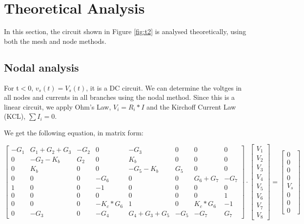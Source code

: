 \section{Theoretical Analysis}
\label{sec:analysis}

In this section, the circuit shown in Figure \ref{fig:t2} is analysed
theoretically,  using both the mesh and node methods.

\subsection{Nodal analysis}
For t$<$0,  $v_s(t)= V_s(t)$,  it is a DC circuit. We can determine the voltges in all nodes and currents in all branches using the nodal method.
Since this is a linear circuit,  we apply Ohm's Law,  $V_i= R_i * I$ and the Kirchoff Current Law (KCL),  $\sum I_i = 0$.

We get the following equation,  in matrix form:

\begin{equation}
\label{eq:matrixeq1}
\begin{bmatrix}
    -G_1 & G_1+G_2+G_3 & -G_2 & 0 & -G_3 & 0 & 0 & 0\\
    0 & -G_2-K_b & G_2 & 0 & K_b & 0 & 0 & 0\\
    0 & K_b & 0 & 0 & -G_5-K_b & G_5 & 0 & 0\\
    0 & 0 & 0 & -G_6 & 0 & 0 & G_6+G_7 & -G_7\\
    1 & 0 & 0 & -1 & 0 & 0 & 0 & 0\\
    0 & 0 & 0 & 0 & 0 & 0 & 0 & 1\\
    0 & 0 & 0 & -K_c*G_6 & 1 & 0 & K_c*G_6 & -1\\
    0 & -G_3 & 0 & -G_4 & G_4+G_3+G_5 & -G_5 & -G_7 & G_7
\end{bmatrix}
\cdot
\begin{bmatrix}
V_1 \\
V_2 \\
V_3 \\
V_4 \\
V_5 \\
V_6 \\
V_7 \\
V_8 
\end{bmatrix}
=
\begin{bmatrix}
0 \\
0 \\
0 \\
0\\
V_s\\
0 \\
0 \\
0
\end{bmatrix}
\end{equation}


